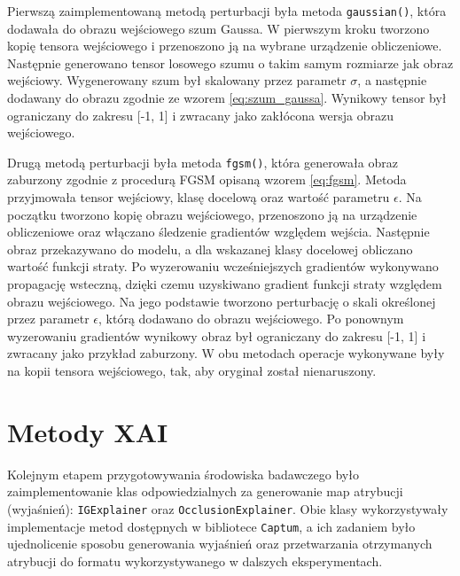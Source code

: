 Pierwszą zaimplementowaną metodą perturbacji była metoda \texttt{gaussian()}, która dodawała do obrazu wejściowego szum Gaussa. W pierwszym kroku tworzono kopię tensora wejściowego i przenoszono ją na wybrane urządzenie obliczeniowe. Następnie generowano tensor losowego szumu o takim samym rozmiarze jak obraz wejściowy. Wygenerowany szum był skalowany przez parametr $\sigma$, a następnie dodawany do obrazu zgodnie ze wzorem \ref{eq:szum_gaussa}. Wynikowy tensor był ograniczany do zakresu [-1, 1] i zwracany jako zakłócona wersja obrazu wejściowego.

Drugą metodą perturbacji była metoda \texttt{fgsm()}, która generowała obraz zaburzony zgodnie z procedurą FGSM opisaną wzorem \ref{eq:fgsm}. Metoda przyjmowała tensor wejściowy, klasę docelową oraz wartość parametru $\epsilon$. Na początku tworzono kopię obrazu wejściowego, przenoszono ją na urządzenie obliczeniowe oraz włączano śledzenie gradientów względem wejścia. Następnie obraz przekazywano do modelu, a dla wskazanej klasy docelowej obliczano wartość funkcji straty. Po wyzerowaniu wcześniejszych gradientów wykonywano propagację wsteczną, dzięki czemu uzyskiwano gradient funkcji straty względem obrazu wejściowego. Na jego podstawie tworzono perturbację o skali określonej przez parametr $\epsilon$, którą dodawano do obrazu wejściowego. Po ponownym wyzerowaniu gradientów wynikowy obraz był ograniczany do zakresu [-1, 1] i zwracany jako przykład zaburzony. W obu metodach operacje wykonywane były na kopii tensora wejściowego, tak, aby oryginał został nienaruszony.

\section{Metody XAI}
\label{sec:metody_wyjasniania_decyzji_modeli}

Kolejnym etapem przygotowywania środowiska badawczego było zaimplementowanie klas odpowiedzialnych za generowanie map atrybucji (wyjaśnień): \texttt{IGExplainer} oraz \texttt{OcclusionExplainer}. Obie klasy wykorzystywały implementacje metod dostępnych w bibliotece \texttt{Captum}, a ich zadaniem było ujednolicenie sposobu generowania wyjaśnień oraz przetwarzania otrzymanych atrybucji do formatu wykorzystywanego w dalszych eksperymentach. 

